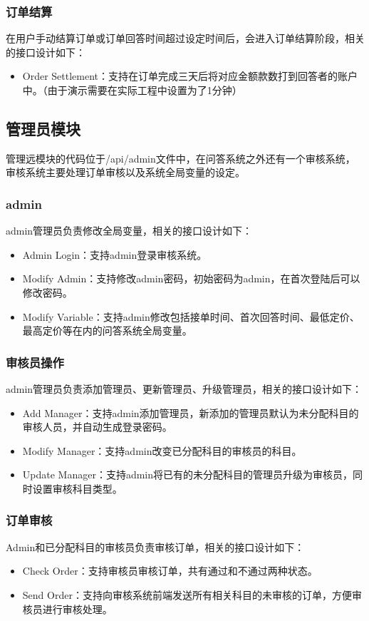 \documentclass[12pt]{ctexart}
\begin{document}
\subsubsection{订单结算}
在用户手动结算订单或订单回答时间超过设定时间后，会进入订单结算阶段，相关的接口设计如下：
\begin{itemize}
	\item Order Settlement：支持在订单完成三天后将对应金额款数打到回答者的账户中。（由于演示需要在实际工程中设置为了1分钟）
\end{itemize}
\subsection{管理员模块}
管理远模块的代码位于/api/admin文件中，在问答系统之外还有一个审核系统，审核系统主要处理订单审核以及系统全局变量的设定。
\subsubsection{admin}
admin管理员负责修改全局变量，相关的接口设计如下：
\begin{itemize}
	\item Admin Login：支持admin登录审核系统。
	\item Modify Admin：支持修改admin密码，初始密码为admin，在首次登陆后可以修改密码。
	\item Modify Variable：支持admin修改包括接单时间、首次回答时间、最低定价、最高定价等在内的问答系统全局变量。
\end{itemize}
\subsubsection{审核员操作}
admin管理员负责添加管理员、更新管理员、升级管理员，相关的接口设计如下：
\begin{itemize}
	\item Add Manager：支持admin添加管理员，新添加的管理员默认为未分配科目的审核人员，并自动生成登录密码。
	\item Modify Manager：支持admin改变已分配科目的审核员的科目。
	\item Update Manager：支持admin将已有的未分配科目的管理员升级为审核员，同时设置审核科目类型。
\end{itemize}
\subsubsection{订单审核}
Admin和已分配科目的审核员负责审核订单，相关的接口设计如下：
\begin{itemize}
	\item Check Order：支持审核员审核订单，共有通过和不通过两种状态。
	\item Send Order：支持向审核系统前端发送所有相关科目的未审核的订单，方便审核员进行审核处理。
\end{itemize}
\end{document}
